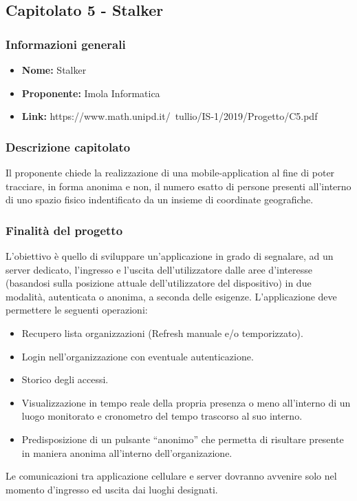 \subsection{Capitolato 5 - Stalker}

	\subsubsection{Informazioni generali}
		\begin{itemize}
			\item \textbf{Nome:} Stalker
			\item \textbf{Proponente:} Imola Informatica
			\item \textbf{Link:} https://www.math.unipd.it/~tullio/IS-1/2019/Progetto/C5.pdf
		\end{itemize}
	
	\subsubsection{Descrizione capitolato}
		Il proponente chiede la realizzazione di una mobile-application al fine di poter tracciare, in forma anonima e non, il numero esatto di persone presenti all'interno di uno spazio fisico indentificato da un insieme di coordinate geografiche.
		
	\subsubsection{Finalità del progetto}
		L’obiettivo è quello di sviluppare un’applicazione in grado di segnalare, ad un server dedicato, l’ingresso e l’uscita dell’utilizzatore dalle aree d’interesse (basandosi sulla posizione attuale dell'utilizzatore del dispositivo) in due modalità, autenticata o anonima, a seconda delle esigenze.
		L’applicazione deve permettere le seguenti operazioni: 
		\begin{itemize}
			\item Recupero lista organizzazioni (Refresh manuale e/o temporizzato).
			\item Login nell’organizzazione con eventuale autenticazione.
			\item Storico degli accessi.
			\item Visualizzazione in tempo reale della propria presenza o meno all’interno di un luogo monitorato e cronometro del tempo trascorso al suo interno.
			\item Predisposizione di un pulsante “anonimo” che permetta di risultare presente in maniera anonima all'interno dell'organizazione.
		\end{itemize}
		Le comunicazioni tra applicazione cellulare e server dovranno avvenire solo nel momento d'ingresso ed uscita dai luoghi designati.
	
